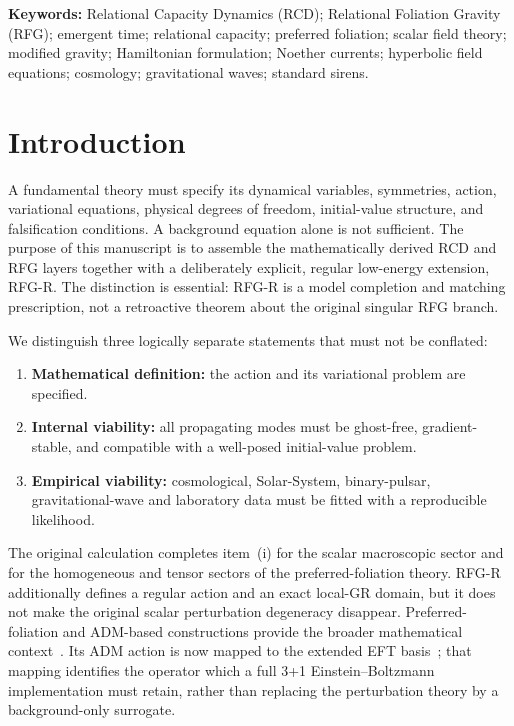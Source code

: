 \documentclass[11pt,a4paper]{article}
\begin{document}
\bigskip
\noindent\textbf{Keywords:}
Relational Capacity Dynamics (RCD);
Relational Foliation Gravity (RFG);
emergent time;
relational capacity;
preferred foliation;
scalar field theory;
modified gravity;
Hamiltonian formulation;
Noether currents;
hyperbolic field equations;
cosmology;
gravitational waves;
standard sirens.

\newpage
\section{Introduction}

A fundamental theory must specify its dynamical variables, symmetries, action, variational equations, physical degrees of freedom, initial-value structure, and falsification conditions. A background equation alone is not sufficient. The purpose of this manuscript is to assemble the mathematically derived RCD and RFG layers together with a deliberately explicit, regular low-energy extension, RFG-R. The distinction is essential: RFG-R is a model completion and matching prescription, not a retroactive theorem about the original singular RFG branch.

We distinguish three logically separate statements that must not be conflated:

\begin{enumerate}[label=(\roman*)]
\item \textbf{Mathematical definition:} the action and its variational problem are specified.
\item \textbf{Internal viability:} all propagating modes must be ghost-free, gradient-stable, and compatible with a well-posed initial-value problem.
\item \textbf{Empirical viability:} cosmological, Solar-System, binary-pulsar, gravitational-wave and laboratory data must be fitted with a reproducible likelihood.
\end{enumerate}

The original calculation completes item~(i) for the scalar macroscopic sector and for the homogeneous and tensor sectors of the preferred-foliation theory. RFG-R additionally defines a regular action and an exact local-GR domain, but it does not make the original scalar perturbation degeneracy disappear. Preferred-foliation and ADM-based constructions provide the broader mathematical context~\cite{ADM,JacobsonMattingly,Horava,BlasPujolasSibiryakov}. Its ADM action is now mapped to the extended EFT basis~\cite{ExtendedEFTMap}; that mapping identifies the operator which a full 3+1 Einstein--Boltzmann implementation must retain, rather than replacing the perturbation theory by a background-only surrogate.
\end{document}
